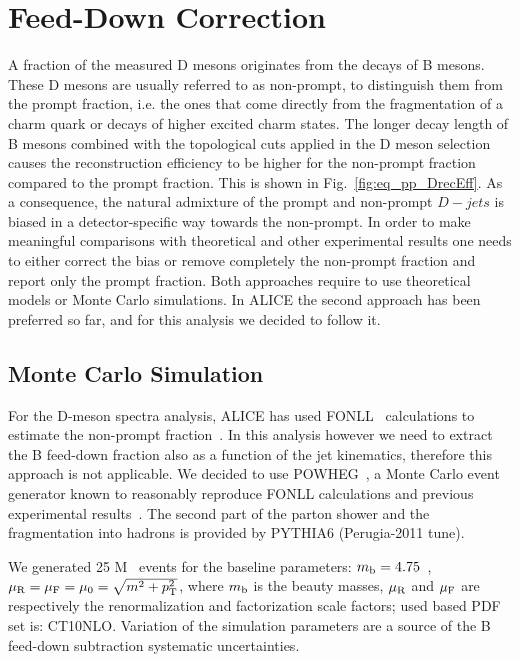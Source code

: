 \section{Feed-Down Correction}
\label{sec:FD}

A fraction of the measured D mesons originates from the decays of B mesons. These D mesons are usually referred to as non-prompt,
to distinguish them from the prompt fraction, i.e. the ones that come directly from the fragmentation of a charm quark or decays of higher excited charm states.
The longer decay length of B mesons combined with the topological cuts applied in the D meson selection causes the reconstruction efficiency 
to be higher for the non-prompt fraction compared to the prompt fraction. This is shown in Fig.~\ref{fig:eq_pp_DrecEff}.
As a consequence, the natural admixture of the prompt and non-prompt $D-jets$ is biased in a detector-specific way towards the non-prompt.
In order to make meaningful comparisons with theoretical and other experimental results one needs to either correct the bias or remove completely the non-prompt fraction and report only the prompt fraction. 
Both approaches require to use theoretical models or Monte Carlo simulations.
In ALICE the second approach has been preferred so far, and for this analysis we decided to follow it.

\subsection{Monte Carlo Simulation}

For the D-meson spectra analysis, ALICE has used FONLL~\cite{Cacciari:1998} calculations to estimate the non-prompt fraction~\cite{ALICE:2011aa, ALICE:2014d, ALICE:2016a}.
In this analysis however we need to extract the B feed-down fraction also as a function of the jet kinematics, therefore this approach is not applicable.
We decided to use POWHEG~\cite{Alioli:2010}, a Monte Carlo event generator known to reasonably reproduce FONLL calculations and previous experimental results~\cite{Cacciari:2012b}.
The second part of the parton shower and the fragmentation into hadrons is provided by PYTHIA6 (Perugia-2011 tune).

We generated 25 M \bbbar\ events for the baseline parameters: 
$m_{\rm b} = 4.75$~\GeVcsq, $\mu_{\rm R} = \mu_{\rm F} =\mu_{0} = \sqrt{m^2+p_{\rm T}^2}$,
where $m_{\rm b}$ is the beauty masses, $\mu_{\rm R}$ and $\mu_{\rm F}$ are respectively the renormalization and factorization scale factors; used based PDF set is: CT10NLO.
Variation of the simulation parameters are a source of the B feed-down subtraction systematic uncertainties.

